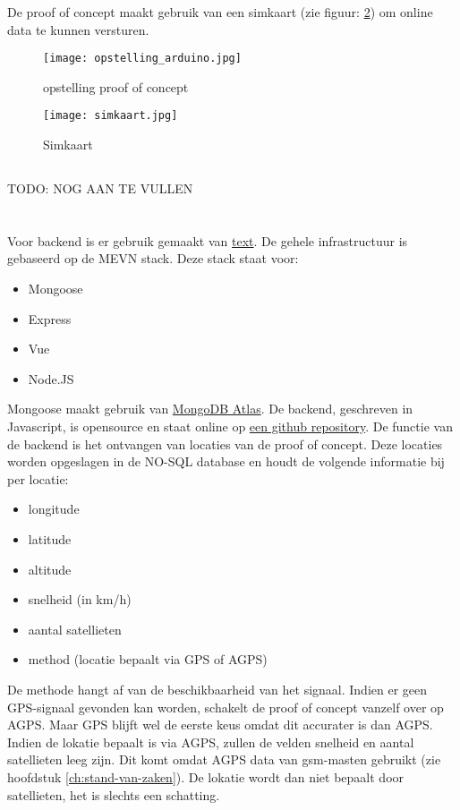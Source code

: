 De proof of concept maakt gebruik van een simkaart (zie figuur: \ref{fig:simkaart}) om online data te kunnen versturen. 
\begin{figure}
	\texttt{[image: opstelling\_arduino.jpg]}
	\caption{opstelling proof of concept}
	\label{fig:opstelling_arduino}
\end{figure}
\begin{figure}
	\texttt{[image: simkaart.jpg]}
	\caption{Simkaart}
	\label{fig:simkaart}
\end{figure}

\subsection{}
TODO: NOG AAN TE VULLEN
\pagebreak
\section{}
\label{ch:backend}

\subsection{}
Voor backend is er gebruik gemaakt van \href{URL}{text}. De gehele infrastructuur is gebaseerd op de MEVN stack.
Deze stack staat voor:
\begin{itemize}
	\item Mongoose
	\item Express
	\item Vue
	\item Node.JS
\end{itemize}
Mongoose maakt gebruik van \href{https://www.mongodb.com/cloud/atlas}{MongoDB Atlas}. De backend, geschreven in Javascript, is opensource en staat online op \href{https://github.com/IndyVC/bap-backend}{een github repository}.
\newline
De functie van de backend is het ontvangen van locaties van de proof of concept. Deze locaties worden opgeslagen in de NO-SQL database en houdt de volgende informatie bij per locatie:
\begin{itemize}
	\item longitude
	\item latitude
	\item altitude
	\item snelheid (in km/h)
	\item aantal satellieten
	\item method (locatie bepaalt via GPS of AGPS)
\end{itemize}
De methode hangt af van de beschikbaarheid van het signaal. Indien er geen GPS-signaal gevonden kan worden, schakelt de proof of concept vanzelf over op AGPS. Maar GPS blijft wel de eerste keus omdat dit accurater is dan AGPS. Indien de lokatie bepaalt is via AGPS, zullen de velden snelheid en aantal satellieten leeg zijn. Dit komt omdat AGPS data van gsm-masten gebruikt (zie hoofdstuk \ref{ch:stand-van-zaken}). De lokatie wordt dan niet bepaalt door satellieten, het is slechts een schatting. 

